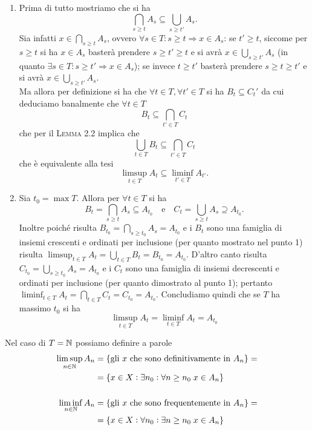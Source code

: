 \begin{enumerate}
\item Prima di tutto mostriamo che si ha \[\bigcap_{s \geq t} A_s \subseteq \bigcup_{s \geq t'} A_s.\] Sia infatti $ x \in \bigcap_{s \geq t} A_s $, ovvero $ \forall s \in T : s \geq t \Rightarrow x \in A_s $: se $ t' \geq t $, siccome per $ s \geq t $ si ha $ x \in A_s $ basterà prendere $ s \geq t' \geq t $ e si avrà $ x \in \bigcup_{s \geq t'} A_s  $ (in quanto $ \exists s \in T: s \geq t' \Rightarrow x \in A_s $); se invece $ t \geq t' $ basterà prendere $ s \geq t \geq t' $ e si avrà $ x \in \bigcup_{s \geq t'} A_s  $.\\
  Ma allora per definizione si ha che $ \forall t \in T , \forall t' \in T $ si ha $ B_t \subseteq C_t' $ da cui deduciamo banalmente che $ \forall t \in T $ \[B_t \subseteq \bigcap_{t' \in T} C_t\] che per il \textsc{Lemma 2.2} implica che \[\bigcup_{t \in T} B_t \subseteq \bigcap_{t' \in T} C_t\] che è equivalente alla tesi \[\limsup_{t \in T} A_t \subseteq \liminf_{t' \in T} A_{t'}.\]
\item Sia $ t_0 = \max T $. Allora per $ \forall t \in T $ si ha \[B_t = \bigcap_{s \geq t} A_s \subseteq A_{t_0} \quad \mathrm{e} \quad C_t = \bigcup_{s \geq t} A_s \supseteq A_{t_0}.\] Inoltre poiché risulta $ B_{t_0} = \bigcap_{s \geq t_0} A_s = A_{t_0} $ e i $ B_t $ sono una famiglia di insiemi crescenti e ordinati per inclusione (per quanto mostrato nel punto 1) risulta $ \limsup_{t \in T} A_t = \bigcup_{t \in T} B_t = B_{t_0} = A_{t_0} $. D'altro canto risulta $ C_{t_0} = \bigcup_{s \geq t_0} A_s = A_{t_0} $ e i $ C_t $ sono una famiglia di insiemi decrescenti e ordinati per inclusione (per quanto dimostrato al punto 1); pertanto $ \liminf_{t \in T} A_t = \bigcap_{t \in T} C_t = C_{t_0} = A_{t_0} $. Concludiamo quindi che se $ T $ ha massimo $ t_0 $ si ha \[\limsup_{t \in T} A_t = \liminf_{t \in T} A_t = A_{t_0}\]
\end{enumerate}
Nel caso di $ T = \mathbb{N} $ possiamo definire a parole
\begin{align*}
  \limsup_{n \in \mathbb{N}} A_n & = \{\text{gli $ x $ che sono definitivamente in $ A_n $}\} = \\
                         & = \{x \in X : \exists n_0 : \forall n \geq n_0 \; x \in A_n\} \\
                         & \\
  \liminf_{n \in \mathbb{N}} A_n & = \{\text{gli $ x $ che sono frequentemente in $ A_n $}\} = \\
                         & = \{x \in X : \forall n_0 : \exists n \geq n_0 \; x \in A_n\}\\
\end{align*}

